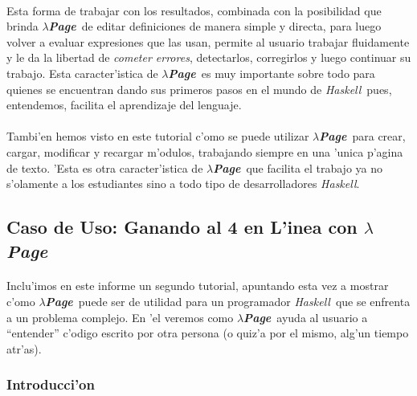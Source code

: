 \documentclass[a4paper]{article}
\newcommand{\haskell}{\textsl{Haskell}}
\newcommand{\hpage}{\textbf{\textsl{$\lambda$Page}}}
\begin{document}
\paragraph{}Esta forma de trabajar con los resultados, combinada con la posibilidad que brinda \hpage\ de editar definiciones de manera simple y directa, para luego volver a evaluar expresiones que las usan, permite al usuario trabajar fluidamente y le da la libertad de \textsl{cometer errores}, detectarlos, corregirlos y luego continuar su trabajo.  Esta caracter'istica de \hpage\ es muy importante sobre todo para quienes se encuentran dando sus primeros pasos en el mundo de \haskell\ pues, entendemos, facilita el aprendizaje del lenguaje.
\paragraph{}Tambi'en hemos visto en este tutorial c'omo se puede utilizar \hpage\ para crear, cargar, modificar y recargar m'odulos, trabajando siempre en una 'unica p'agina de texto.  'Esta es otra caracter'istica de \hpage\ que facilita el trabajo ya no s'olamente a los estudiantes sino a todo tipo de desarrolladores \haskell.

\newpage
\subsection{Caso de Uso: Ganando al 4 en L'inea con \hpage}
\begin{epigraphs}
\end{epigraphs}
\paragraph{}Inclu'imos en este informe un segundo tutorial, apuntando esta vez a mostrar c'omo \hpage\ puede ser de utilidad para un programador \haskell\ que se enfrenta a un problema complejo.  En 'el veremos como \hpage\ ayuda al usuario a ``entender'' c'odigo escrito por otra persona (o quiz'a por el mismo, alg'un tiempo atr'as).
\subsubsection{Introducci'on}
\end{document}
